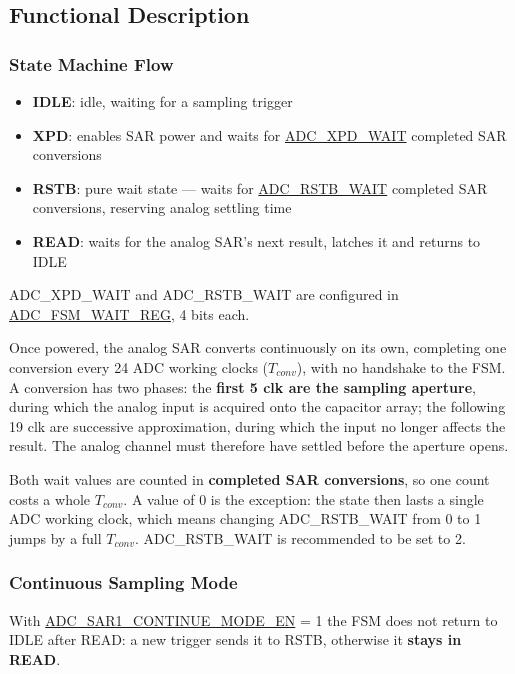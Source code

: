 \documentclass[main\_\_EN.tex]{subfiles}
\begin{document}
\subsection{Functional Description}
\label{sec:adc-fsm-func-descr}

\subsubsection{State Machine Flow}
\begin{itemize}
    \item \textbf{IDLE}: idle, waiting for a sampling trigger
    \item \textbf{XPD}: enables SAR power and waits for \hyperref[fielddesc:ADCXPDWAIT]{ADC\_XPD\_WAIT} completed SAR conversions
    \item \textbf{RSTB}: pure wait state --- waits for \hyperref[fielddesc:ADCRSTBWAIT]{ADC\_RSTB\_WAIT} completed SAR conversions, reserving analog settling time
    \item \textbf{READ}: waits for the analog SAR's next result, latches it and returns to IDLE
\end{itemize}

ADC\_XPD\_WAIT and ADC\_RSTB\_WAIT are configured in \hyperref[regdesc:ADCFSMWAITREG]{ADC\_FSM\_WAIT\_REG}, 4 bits each.

Once powered, the analog SAR converts continuously on its own, completing one conversion every 24 ADC working clocks ($T_{conv}$), with no handshake to the FSM. A conversion has two phases: the \textbf{first 5 clk are the sampling aperture}, during which the analog input is acquired onto the capacitor array; the following 19 clk are successive approximation, during which the input no longer affects the result. The analog channel must therefore have settled before the aperture opens.

Both wait values are counted in \textbf{completed SAR conversions}, so one count costs a whole $T_{conv}$. A value of 0 is the exception: the state then lasts a single ADC working clock, which means changing ADC\_RSTB\_WAIT from 0 to 1 jumps by a full $T_{conv}$. ADC\_RSTB\_WAIT is recommended to be set to 2.

\subsubsection{Continuous Sampling Mode}
With \hyperref[fielddesc:ADCSAR1CONTINUEMODEEN]{ADC\_SAR1\_CONTINUE\_MODE\_EN} = 1 the FSM does not return to IDLE after READ: a new trigger sends it to RSTB, otherwise it \textbf{stays in READ}.
\end{document}
